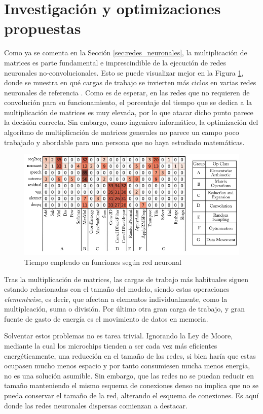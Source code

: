 \section{Investigación y optimizaciones propuestas}
\label{sec:investigacion_optimizaciones_propuestas}
Como ya se comenta en la Sección \ref{sec:redes_neuronales}, la multiplicación de matrices es parte fundamental e imprescindible de la ejecución de redes neuronales no-convolucionales. Esto se puede visualizar mejor en la Figura \ref{fig:profiling_several_nns}, donde se muestra en qué cargas de trabajo se invierten más ciclos en varias redes neuronales de referencia \cite[Figure 3.4]{deep_learning_for_computer_architects}. Como es de esperar, en las redes que no requieren de convolución para su funcionamiento, el porcentaje del tiempo que se dedica a la multiplicación de matrices es muy elevada, por lo que atacar dicho punto parece la decisión correcta. Sin embargo, como ingeniero informático, la optimización del algoritmo de multiplicación de matrices generales no parece un campo poco trabajado y abordable para una persona que no haya estudiado matemáticas.

\begin{figure}[h!]
    \centering
    \includegraphics[width=\textwidth]{pdf_tex/dlfca_figure3_4.pdf}
    \caption{Tiempo empleado en funciones según red neuronal}
    \label{fig:profiling_several_nns}
\end{figure}

Tras la multiplicación de matrices, las cargas de trabajo más habituales siguen estando relacionadas con el tamaño del modelo, siendo estas operaciones \textit{elementwise}, es decir, que afectan a elementos individualmente, como la multiplcación, suma o división. Por último otra gran carga de trabajo, y gran fuente de gasto de energía es el movimiento de datos en memoria.

Solventar estos problemas no es tarea trivial. Ignorando la Ley de Moore, mediante la cual los microchips tienden a ser cada vez más eficientes energéticamente, una reducción en el tamaño de las redes, si bien haría que estas ocupasen mucho menos espacio y por tanto consumiesen mucha menos energía, no es una solución asumible. Sin embargo, que las redes no se puedan reducir en tamaño manteniendo el mismo esquema de conexiones denso no implica que no se pueda conservar el tamaño de la red, alterando el esquema de conexiones. Es aquí donde las redes neuronales dispersas comienzan a destacar.

